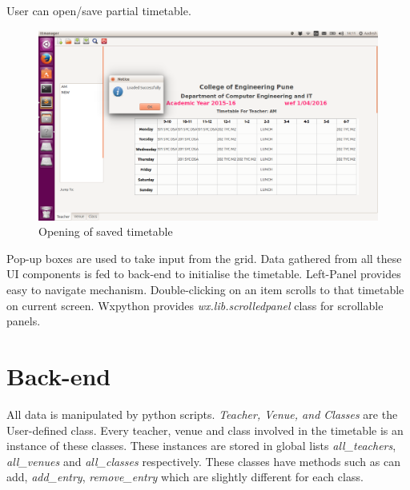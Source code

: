 \newpage
User can open/save partial timetable.
\begin{figure}[ht!]
	\centering
	\includegraphics[width=160mm]{4.png}
	\caption{Opening of saved timetable}
\end{figure}

Pop-up boxes are used to take input from the grid. Data gathered from all these UI components is fed to back-end to initialise the timetable. Left-Panel provides easy to navigate mechanism. Double-clicking on an item scrolls to that timetable on current screen. Wxpython provides \textit{wx.lib.scrolledpanel} class for scrollable panels.

\newpage
\section{Back-end}
All data is manipulated by python scripts. \textit{Teacher, Venue, and Classes} are the User-defined class. Every teacher, venue and class involved in the timetable is an instance of these classes. These instances are stored in global lists \textit{all\_teachers}, \textit{all\_venues} and \textit{all\_classes} respectively.
These classes have methods such as can add, \textit{add\_entry}, \textit{remove\_entry} which are slightly different for each class.

